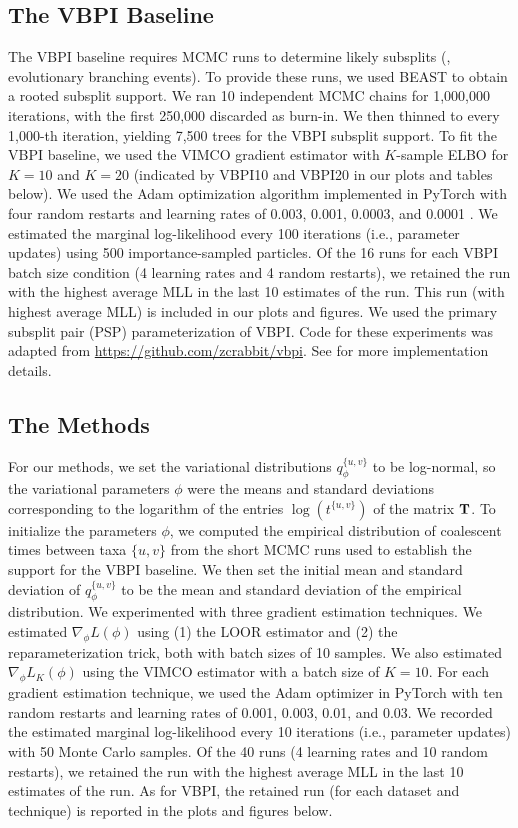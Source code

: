 \subsection{The VBPI Baseline}
The VBPI baseline requires MCMC runs to determine likely subsplits (\ie, evolutionary branching events). To provide these runs, we used BEAST to obtain a rooted subsplit support. We ran 10 independent MCMC chains for 1,000,000 iterations, with the first 250,000 discarded as burn-in. We then thinned to every 1,000-th iteration, yielding 7,500 trees for the VBPI subsplit support.
%
To fit the VBPI baseline, we used the VIMCO gradient estimator with $K$-sample ELBO for $K=10$ and $K=20$ (indicated by VBPI10 and VBPI20 in our plots and tables below). We used the Adam optimization algorithm implemented in PyTorch with four random restarts and learning rates of 0.003, 0.001, 0.0003, and 0.0001 \citep{Kingma:2014a, Paszke:2019}. We estimated the marginal log-likelihood every 100 iterations (i.e., parameter updates) using 500 importance-sampled particles.
%
Of the 16 runs for each VBPI batch size condition (4 learning rates and 4 random restarts), we retained the run with the highest average MLL in the last 10 estimates of the run. This run (with highest average MLL) is included in our plots and figures. We used the primary subsplit pair (PSP) parameterization of VBPI. Code for these experiments was adapted from \url{https://github.com/zcrabbit/vbpi}. See \citet{Zhang:2024} for more implementation details. 

\subsection{The \model Methods}
For our \model methods, we set the variational distributions $q_\phi^{\{u,v\}}$ to be log-normal, so the variational parameters $\phi$ were the means and standard deviations corresponding to the logarithm of the entries $\log(t^{\{u,v\}})$ of the matrix $\mathbf{T}$.
%
To initialize the parameters $\phi$, we computed the empirical distribution of coalescent times between taxa $\{u,v\}$ from the short MCMC runs used to establish the support for the VBPI baseline. We then set the initial mean and standard deviation of $q_\phi^{\{u,v\}}$ to be the mean and standard deviation of the empirical distribution.
%
We experimented with three gradient estimation techniques. We estimated $\nabla_{\phi} L(\phi)$ using (1) the LOOR estimator and (2) the reparameterization trick, both with batch sizes of 10 samples. We also estimated $\nabla_{\phi} L_K(\phi)$ using the VIMCO estimator with a batch size of $K=10$.
%
For each gradient estimation technique, we used the Adam optimizer in PyTorch with ten random restarts and learning rates of 0.001, 0.003, 0.01, and 0.03. We recorded the estimated marginal log-likelihood every 10 iterations (i.e., parameter updates) with 50 Monte Carlo samples. Of the 40 runs (4 learning rates and 10 random restarts), we retained the run with the highest average MLL in the last 10 estimates of the run. As for VBPI, the retained run (for each dataset and technique) is reported in the plots and figures below.

